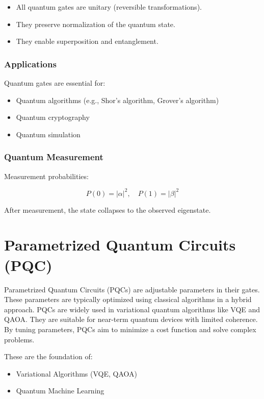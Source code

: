 \begin{itemize}
\item All quantum gates are unitary (reversible transformations).
\item They preserve normalization of the quantum state.
\item They enable superposition and entanglement.
\end{itemize}

\subsubsection{Applications}

Quantum gates are essential for:
\begin{itemize}
\item Quantum algorithms (e.g., Shor's algorithm, Grover's algorithm)
\item Quantum cryptography
\item Quantum simulation
\end{itemize}

\subsubsection{Quantum Measurement}

Measurement probabilities:

\[
P(0) = |\alpha|^2, \quad P(1) = |\beta|^2
\]

After measurement, the state collapses to the observed eigenstate.

\vspace{0.5cm}

\section{Parametrized Quantum Circuits (PQC)}

Parametrized Quantum Circuits (PQCs) are adjustable parameters in their gates.
These parameters are typically optimized using classical algorithms in a hybrid approach.
PQCs are widely used in variational quantum algorithms like VQE and QAOA.
They are suitable for near-term quantum devices with limited coherence.
By tuning parameters, PQCs aim to minimize a cost function and solve complex problems.


These are the foundation of:
\begin{itemize}
\item Variational Algorithms (VQE, QAOA)
\item Quantum Machine Learning
\end{itemize}

